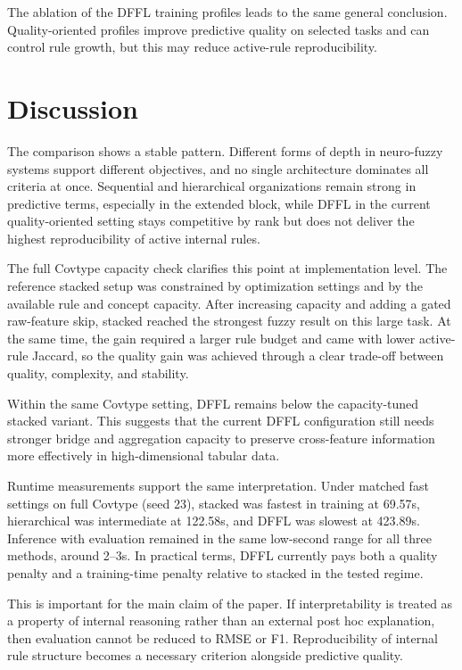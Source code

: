 \documentclass[runningheads]{llncs}
\begin{document}
The ablation of the DFFL training profiles leads to the same general conclusion. Quality-oriented profiles improve predictive quality on selected tasks and can control rule growth, but this may reduce active-rule reproducibility.

\section{Discussion}

The comparison shows a stable pattern. Different forms of depth in neuro-fuzzy systems support different objectives, and no single architecture dominates all criteria at once. Sequential and hierarchical organizations remain strong in predictive terms, especially in the extended block, while DFFL in the current quality-oriented setting stays competitive by rank but does not deliver the highest reproducibility of active internal rules.

The full Covtype capacity check clarifies this point at implementation level. The reference stacked setup was constrained by optimization settings and by the available rule and concept capacity. After increasing capacity and adding a gated raw-feature skip, stacked reached the strongest fuzzy result on this large task. At the same time, the gain required a larger rule budget and came with lower active-rule Jaccard, so the quality gain was achieved through a clear trade-off between quality, complexity, and stability.

Within the same Covtype setting, DFFL remains below the capacity-tuned stacked variant. This suggests that the current DFFL configuration still needs stronger bridge and aggregation capacity to preserve cross-feature information more effectively in high-dimensional tabular data.

Runtime measurements support the same interpretation. Under matched fast settings on full Covtype (seed 23), stacked was fastest in training at 69.57s, hierarchical was intermediate at 122.58s, and DFFL was slowest at 423.89s. Inference with evaluation remained in the same low-second range for all three methods, around 2--3s. In practical terms, DFFL currently pays both a quality penalty and a training-time penalty relative to stacked in the tested regime.

This is important for the main claim of the paper. If interpretability is treated as a property of internal reasoning rather than an external post hoc explanation, then evaluation cannot be reduced to RMSE or F1. Reproducibility of internal rule structure becomes a necessary criterion alongside predictive quality.
\end{document}
